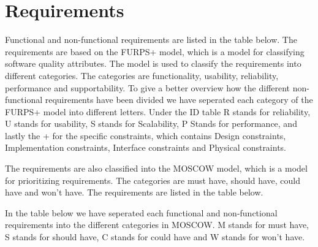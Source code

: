 
\section{Requirements}

Functional and non-functional\cite{example} requirements are listed in the table below. The requirements are based on the FURPS+ model, which is a model for classifying software quality attributes. The model is used to classify the requirements into different categories. The categories are functionality, usability, reliability, performance and supportability.
To give a better overview how the different non-functional requirements have been divided we have seperated each category of the FURPS+ model into different letters. Under the ID table R stands for reliability, U stands for usability, S stands for Scalability, P Stands for performance, and lastly the + for the specific constraints, which contains Design constraints, Implementation constraints, Interface constraints and Physical constraints. \newline

The requirements are also classified into the MOSCOW model, which is a model for prioritizing requirements. The categories are must have, should have, could have and won't have. The requirements are listed in the table below. \newline

In the table below we have seperated each functional and non-functional requirements into the different categories in MOSCOW. M stands for must have, S stands for should have, C stands for could have and W stands for won't have.\newline

